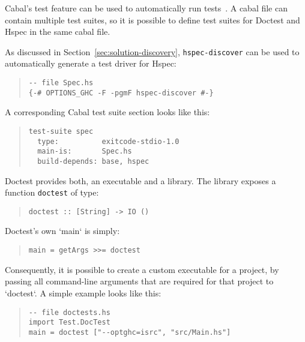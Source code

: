 \documentclass[preprint]{sigplanconf}
\begin{document}
\noindent Cabal's test feature can be used to automatically run tests~\cite{cabal}.  A cabal
file can contain multiple test suites, so it is possible to define test suites
for Doctest and Hspec in the same cabal file.

As discussed in Section~\ref{sec:solution-discovery},
{\tt hspec-discover} can be used to automatically generate a test
driver for Hspec:

\begin{quote}
\small
\begin{verbatim}
-- file Spec.hs
{-# OPTIONS_GHC -F -pgmF hspec-discover #-}
\end{verbatim}
\end{quote}

\noindent A corresponding Cabal test suite section looks like this:

\begin{quote}
\small
\begin{verbatim}
test-suite spec
  type:          exitcode-stdio-1.0
  main-is:       Spec.hs
  build-depends: base, hspec
\end{verbatim}
\end{quote}

\noindent Doctest provides both, an executable and a library.  The library
exposes a function \verb|doctest| of type:


\begin{quote}
\small
\begin{verbatim}
doctest :: [String] -> IO ()
\end{verbatim}
\end{quote}

\noindent Doctest's own `main` is simply:
\begin{quote}
\small
\begin{verbatim}
main = getArgs >>= doctest
\end{verbatim}
\end{quote}



\noindent Consequently, it is possible to create a custom executable
for a project, by passing all command-line arguments that are required
for that project to `doctest`.  A simple example looks like this:

\begin{quote}
\small
\begin{verbatim}
-- file doctests.hs
import Test.DocTest
main = doctest ["--optghc=isrc", "src/Main.hs"]
\end{verbatim}
\end{quote}
\end{document}
